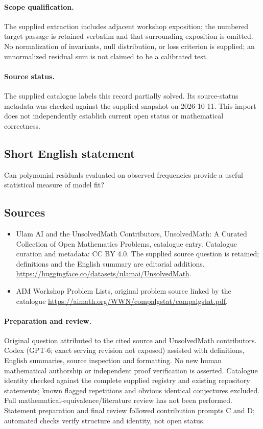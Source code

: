 \documentclass[11pt]{article}
\begin{document}
\paragraph{Scope qualification.}
The supplied extraction includes adjacent workshop exposition; the numbered target passage is retained verbatim and that surrounding exposition is omitted. No normalization of invariants, null distribution, or loss criterion is supplied; an unnormalized residual sum is not claimed to be a calibrated test.
\paragraph{Source status.}
The supplied catalogue labels this record partially solved. Its source-status metadata was checked against the supplied snapshot on 2026-10-11. This import does not independently establish current open status or mathematical correctness.
\subsection{Short English statement}
Can polynomial residuals evaluated on observed frequencies provide a useful statistical measure of model fit?
\subsection{Sources}
\begin{itemize}
\item[S1] Ulam AI and the UnsolvedMath Contributors, UnsolvedMath: A Curated Collection of Open Mathematics Problems, catalogue entry. Catalogue curation and metadata: CC BY 4.0. The supplied source question is retained; definitions and the English summary are editorial additions.
\url{https://huggingface.co/datasets/ulamai/UnsolvedMath}.
\item[S2] AIM Workshop Problem Lists, original problem source linked by the catalogue
\url{https://aimath.org/WWN/compalgstat/compalgstat.pdf}.
\end{itemize}
\paragraph{Preparation and review.}
Original question attributed to the cited source and UnsolvedMath contributors. Codex (GPT-6; exact serving revision not exposed) assisted with definitions, English summaries, source inspection and formatting. No new human mathematical authorship or independent proof verification is asserted. Catalogue identity checked against the complete supplied registry and existing repository statements; known flagged repetitions and obvious identical conjectures excluded. Full mathematical-equivalence/literature review has not been performed. Statement preparation and final review followed contribution prompts C and D; automated checks verify structure and identity, not open status.
\label{end:statement}
\end{document}
